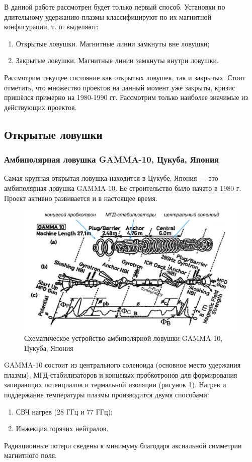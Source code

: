 В данной работе рассмотрен будет только первый способ. Установки по длительному удержанию плазмы классифицируют по их магнитной конфигурации, т. о. выделяют:
\begin{enumerate}
\item Открытые ловушки. Магнитные линии замкнуты вне ловушки;
\item Закрытые ловушки. Магнитные линии замкнуты внутри ловушки.
\end{enumerate}

Рассмотрим текущее состояние как открытых ловушек, так и закрытых. Стоит отметить, что множество проектов на данный момент уже закрыты, кризис пришёлся примерно на 1980-1990 гг. Рассмотрим только наиболее значимые из действующих проектов.

\subsection{Открытые ловушки}
\label{sec:open_trap}

\subsubsection{Амбиполярная ловушка GAMMA-10, Цукуба, Япония}

Самая крупная открытая ловушка находится в Цукубе, Япония --- это амбиполярная ловушка GAMMA-10. Её строительство было начато в 1980 г. \cite{gamma10_history} Проект активно развивается и в настоящее время.


\begin{figure}[h]
\centering
\includegraphics[width=0.9\linewidth]{./fig/ch1/GAMMA10}
\caption{Схематическое устройство амбиполярной ловушки GAMMA-10, Цукуба, Япония}
\label{fig:GAMMA10}
\end{figure}


GAMMA-10 состоит из центрального соленоида (основное место удержания плазмы), МГД-стабилизаторов и концевых пробкотронов для формирования запирающих потенциалов и термальной изоляции (рисунок \ref{fig:GAMMA10}). Нагрев и поддержание температуры плазмы производится двумя способами:
\begin{enumerate}
\item СВЧ нагрев (28 ГГц и 77 ГГц);
\item Инжекция горячих нейтралов.
\end{enumerate}
Радиационные потери сведены к минимуму благодаря аксиальной симметрии магнитного поля\cite{gamma10_review}.

